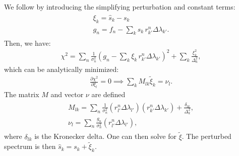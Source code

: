We follow \citet{Budavari2000b} by introducing the simplifying perturbation and constant terms: 
\begin{align}
    \begin{gathered}
        \xi_k = \hat{s}_k - s_k \\
        g_n = f_n - \sum_k s_k \, r_{k'}^n \Delta\lambda_{k'}.
    \end{gathered}
\end{align} 
Then, we have:
\begin{align}
    \chi^2 = 
    \sum_n \frac{1}{\sigma_n^2} \left( g_n - \sum_k \xi_k \,  r_{k'}^n \Delta\lambda_{k'} \right)^2 +
    \sum_k \frac{\xi_k^2}{\Delta_k^2},
\end{align}
which can be analytically minimized:
\begin{align}
    \frac{\partial \chi^2}{\partial \xi_l} = 0 \implies \sum_k M_{lk} \tilde{\xi}_k = \nu_l.
\end{align}
The matrix $M$ and vector $\nu$ are defined
\begin{align}
    \begin{gathered}
        M_{lk} = \sum_n \frac{1}{\sigma_n^2} (r_{l'}^n \Delta\lambda_{l'}) (r_{k'}^n \Delta\lambda_{k'}) + \frac{\delta_{lk}}{\Delta_k^2}, \\
        \nu_l = \sum_n \frac{g_n}{\sigma_n^2} (r_{l'}^n \Delta\lambda_{l'}),
    \end{gathered}
\end{align}
where $\delta_{lk}$ is the Kronecker delta.
One can then solve for $\tilde{\xi}$. 
The perturbed spectrum is then $\hat{s}_k = s_k + \tilde{\xi}_k$. 

